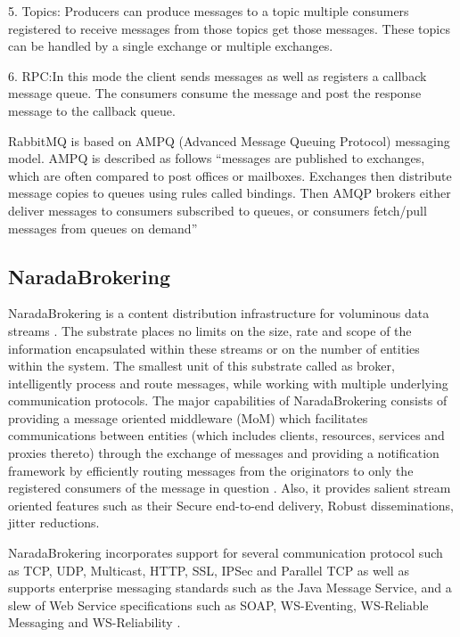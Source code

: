      5. Topics: Producers can produce messages to a topic multiple
        consumers registered to receive messages from those topics get
        those messages. These topics can be handled by a single
        exchange or multiple exchanges.

     6. RPC:In this mode the client sends messages as well as
        registers a callback message queue. The consumers consume the
        message and post the response message to the callback queue.

        RabbitMQ is based on AMPQ (Advanced
        Message Queuing Protocol) messaging model\cite{ampq-article}.
        AMPQ is described
        as follows ``messages are published to exchanges, which are
        often compared to post offices or mailboxes. Exchanges then
        distribute message copies to queues using rules called
        bindings. Then AMQP brokers either deliver messages to
        consumers subscribed to queues, or consumers fetch/pull
        messages from queues on demand''

        \pv

\subsection{NaradaBrokering}

     NaradaBrokering is a content distribution
     infrastructure for voluminous data streams \cite{www-narada}.
     The substrate places
     no limits on the size, rate and scope of the information
     encapsulated within these streams or on the number of entities
     within the system. The smallest unit of this substrate called as
     broker, intelligently process and route messages, while working
     with multiple underlying communication protocols. The major
     capabilities of NaradaBrokering consists of providing a message
     oriented middleware (MoM) which facilitates communications
     between entities (which includes clients, resources, services and
     proxies thereto) through the exchange of messages and providing a
     notification framework by efficiently routing messages from the
     originators to only the registered consumers of the message in
     question \cite{paper-nb-sustrate}. Also, it provides salient
     stream oriented features such as their Secure end-to-end
     delivery, Robust disseminations, jitter reductions.

     NaradaBrokering incorporates support for several communication
     protocol such as TCP, UDP, Multicast, HTTP, SSL, IPSec and
     Parallel TCP as well as supports enterprise messaging standards
     such as the Java Message Service, and a slew of Web Service
     specifications such as SOAP, WS-Eventing, WS-Reliable Messaging
     and WS-Reliability \cite{www-narada-features}.

